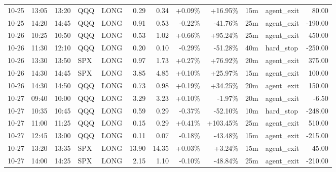 \documentclass[11pt,a4paper]{article}
\begin{document}
\begin{center}
\begin{longtable}{>{\color{txtmain}}l l l l l r r r r r >{\color{txtmain}}l r}
10-25 & 13:05 & 13:20 & QQQ & LONG & 0.29 & 0.34 & \textcolor{wingreen}{+0.09\%} & \textcolor{wingreen}{+16.95\%} & 15m & agent\_exit & \textcolor{wingreen}{80.00} \\
10-25 & 14:20 & 14:45 & QQQ & LONG & 0.91 & 0.53 & \textcolor{lossred}{-0.22\%} & \textcolor{lossred}{-41.76\%} & 25m & agent\_exit & \textcolor{lossred}{-190.00} \\
10-26 & 10:25 & 10:50 & QQQ & LONG & 0.53 & 1.02 & \textcolor{wingreen}{+0.66\%} & \textcolor{wingreen}{+95.24\%} & 25m & agent\_exit & \textcolor{wingreen}{450.00} \\
10-26 & 11:30 & 12:10 & QQQ & LONG & 0.20 & 0.10 & \textcolor{lossred}{-0.29\%} & \textcolor{lossred}{-51.28\%} & 40m & hard\_stop & \textcolor{lossred}{-250.00} \\
10-26 & 13:30 & 13:50 & SPX & LONG & 0.97 & 1.73 & \textcolor{wingreen}{+0.27\%} & \textcolor{wingreen}{+76.92\%} & 20m & agent\_exit & \textcolor{wingreen}{375.00} \\
10-26 & 14:30 & 14:45 & SPX & LONG & 3.85 & 4.85 & \textcolor{wingreen}{+0.10\%} & \textcolor{wingreen}{+25.97\%} & 15m & agent\_exit & \textcolor{wingreen}{100.00} \\
10-26 & 14:30 & 14:50 & QQQ & LONG & 0.73 & 0.98 & \textcolor{wingreen}{+0.19\%} & \textcolor{wingreen}{+34.25\%} & 20m & agent\_exit & \textcolor{wingreen}{150.00} \\
10-27 & 09:40 & 10:00 & QQQ & LONG & 3.29 & 3.23 & \textcolor{wingreen}{+0.10\%} & \textcolor{lossred}{-1.97\%} & 20m & agent\_exit & \textcolor{lossred}{-6.50} \\
10-27 & 10:35 & 10:45 & QQQ & LONG & 0.59 & 0.29 & \textcolor{lossred}{-0.37\%} & \textcolor{lossred}{-52.10\%} & 10m & hard\_stop & \textcolor{lossred}{-248.00} \\
10-27 & 11:00 & 11:25 & QQQ & LONG & 0.15 & 0.29 & \textcolor{wingreen}{+0.41\%} & \textcolor{wingreen}{+103.45\%} & 25m & agent\_exit & \textcolor{wingreen}{510.00} \\
10-27 & 12:45 & 13:00 & QQQ & LONG & 0.11 & 0.07 & \textcolor{lossred}{-0.18\%} & \textcolor{lossred}{-43.48\%} & 15m & agent\_exit & \textcolor{lossred}{-215.00} \\
10-27 & 13:20 & 13:35 & SPX & LONG & 13.90 & 14.35 & \textcolor{wingreen}{+0.03\%} & \textcolor{wingreen}{+3.24\%} & 15m & agent\_exit & \textcolor{wingreen}{45.00} \\
10-27 & 14:00 & 14:25 & SPX & LONG & 2.15 & 1.10 & \textcolor{lossred}{-0.10\%} & \textcolor{lossred}{-48.84\%} & 25m & agent\_exit & \textcolor{lossred}{-210.00} \\

\end{longtable}
\end{center}
\end{document}
